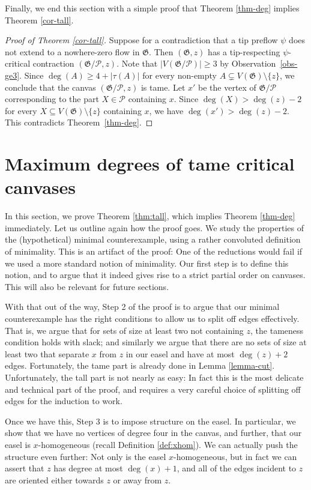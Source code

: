 \documentclass{article}
\newcommand{\PP}{\mathcal{P}}
\newcommand\g{\mathfrak{G}}
\begin{document}
Finally, we end this section with a simple proof that Theorem \ref{thm-deg} implies Theorem \ref{cor-tall}. 
\begin{proof}[Proof of Theorem \ref{cor-tall}]
Suppose for a contradiction that a tip preflow $\psi$ does not extend to a nowhere-zero flow in $\g$.
Then $(\g,z)$ has a tip-respecting $\psi$-critical contraction $(\g/\PP,z)$.  Note that $|V(\g/\PP)|\ge 3$ by Observation~\ref{obs-ge3}.
Since $\deg(A)\ge 4+|\tau(A)|$ for every non-empty $A\subsetneq V(\g)\setminus\{z\}$,
we conclude that the canvas $(\g/\PP,z)$ is tame.  Let $x'$ be the vertex of $\g/\PP$ corresponding to the part $X\in \PP$ containing $x$.
Since $\deg(X)>\deg(z)-2$ for every $X\subseteq V(\g)\setminus\{z\}$ containing $x$, we have $\deg(x')>\deg(z)-2$. This contradicts Theorem~\ref{thm-deg}.
\end{proof}

\section{Maximum degrees of tame critical canvases}\label{sec:thmtall-proof}
In this section, we prove Theorem \ref{thm:tall}, which implies Theorem
\ref{thm-deg} immediately. Let us outline again how the proof goes. We study the properties
of the (hypothetical) minimal counterexample, using a rather convoluted definition of
minimality. This is an artifact of the proof: One of the reductions would
fail if we used a more standard notion of minimality. Our first step is to define
this notion, and to argue that it indeed gives rise to a
strict partial order on canvases. This will also be relevant for future
sections.

With that out of the way, Step 2 of the proof is to argue that our minimal
counterexample has the right conditions to allow us to split off edges
effectively. That is, we argue that for sets of size at least two not
containing $z$, the tameness condition holds with slack; and similarly we argue
that there are no sets of size at least two that separate $x$ from $z$ in our
easel and have at most $\deg(z) +2$ edges. Fortunately, the tame part is
already done in Lemma \ref{lemma-cut}. Unfortunately, the
tall part is not nearly as easy: In fact this is the most delicate and
technical part of the proof, and requires a very careful choice of splitting
off edges for the induction to work.

Once we have this, Step 3 is to impose structure on the easel. In particular,
we show that we have no vertices of degree four in the canvas, and further,
that our easel is $x$-homogeneous (recall Definition \ref{def:xhom}). We can
actually push the structure even further: Not only is the easel
$x$-homogeneous, but in fact we can assert that $z$ has degree at most $\deg(x)
+1$, and all of the edges incident to $z$ are oriented either towards $z$ or
away from $z$.
\end{document}
